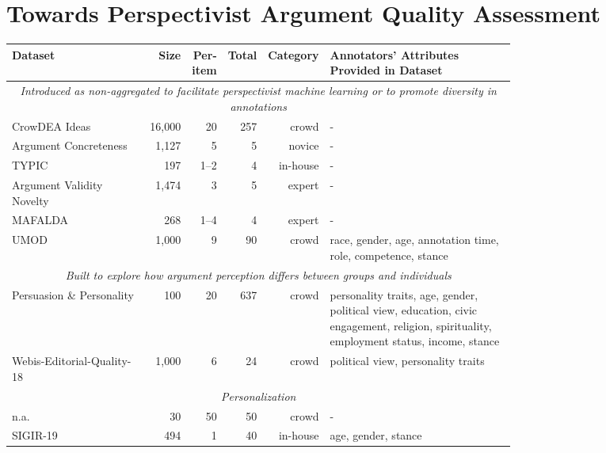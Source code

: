 \section{Towards Perspectivist Argument Quality Assessment}
\label{section-towards_perspectivist-quality-assessment}

\begin{table*}[t]
\centering
\scriptsize
\renewcommand{\arraystretch}{0.90}
\setlength{\tabcolsep}{2.5pt}
\begin{tabular}{p{0.31\linewidth}@{}rrrrp{0.43\linewidth}}
\toprule
\bf Dataset & \bf Size & \bf Per-item & \bf Total & \bf Category & \bf Annotators' Attributes Provided in Dataset\\ 
\midrule
\multicolumn{6}{c}{\em Introduced as non-aggregated to facilitate perspectivist machine learning or to promote diversity in annotations}\\
\midrule
CrowDEA Ideas \cite{Baba_Li_Kashima_2020} & 16,000 & 20 & 257 & crowd & - \\
Argument Concreteness \cite{romberg-etal-2022-corpus} & 1,127 & 5 & 5 & novice & - \\
TYPIC \cite{naito-etal-2022-typic} & 197 & 1--2 & 4 & in-house & - \\
Argument Validity Novelty \cite{heinisch-etal-2023-architectural} & 1,474 & 3 & 5 & expert & - \\
MAFALDA \cite{helwe-etal-2024-mafalda} & 268 & 1--4 & 4 & expert & - \\
UMOD \cite{falk-etal-2024-moderation} & 1,000 & 9 & 90 & crowd & race, gender, age, annotation time, role, competence, stance\\
\midrule
\multicolumn{6}{c}{\em Built to explore how argument perception differs between groups and individuals}\\
\midrule
Persuasion \& Personality \cite{lukin-etal-2017-argument} & 100 & 20 & 637 & crowd & personality traits, age, gender, political view, education, civic engagement, religion, spirituality, employment status, income, stance \\
Webis-Editorial-Quality-18 \cite{el-baff-etal-2018-challenge} & 1,000 & 6 & 24 & crowd & political view, personality traits \\
\midrule
\multicolumn{6}{c}{\em Personalization}\\
\midrule
n.a. \cite{hunter2017empirical} & 30 & 50 & 50 & crowd & - \\
SIGIR-19 \cite{potthast2019argument} & 494 & 1 & 40 & in-house & age, gender, stance \\

\end{tabular}
\end{table*}

